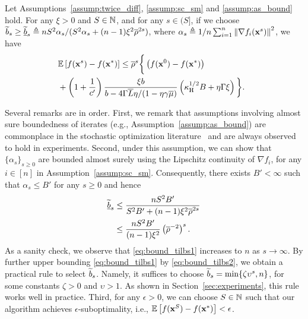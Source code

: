 \documentclass[10pt,twocolumn,journal]{IEEEtran}
\begin{document}
\begin{prop}\label{prop:subsamp_grad_outer}
Let Assumptions~\ref{assump:twice_diff}, \ref{assump:sc_sm} and \ref{assump:as_bound} hold. 
For any $\xi>0$ and $S\in\mathbb{N}$, and for any $s\in(S]$, %
if we choose $\widetilde{b}_s \ge {\underline{\widetilde{b}}}_s\triangleq nS^2\alpha_s/(S^2\alpha_s +(n-1)\xi^2\overline{\rho}^{2s})$, where $\alpha_s \triangleq {1}/{n}\sum_{i=1}^n \left\Vert\nabla f_i(\mathbf{x}^s)\right\Vert^2$, we have
\begin{align}
&\hspace{-.2cm}\bbE\left[f(\bx^{s})-f(\bx^*)\right] \le  \barrho^s\bigg\{\left(f(\bx^{0})-f(\bx^*)\right)\nn\\
&\hspace{-.2cm}+\left(1+\frac{1}{c'}\right)\frac{\xi b}{b-{4\Gamma\barL\eta}/{(1-\eta\gamma\barmu)}}\left(\kappa_\rmH^{1/2}B+{\eta\Gamma \xi}\right)\bigg\}. \label{eq:lin_conv_subsamp_grad}
\end{align}
\end{prop}

\begin{remark}\label{rmk:part_grad}
Several remarks are in order. First, we remark that assumptions involving almost sure boundedness of iterates (e.g., Assumption~\ref{assump:as_bound}) %
are commonplace in the stochastic optimization literature~\cite{Borkar_08,Hu_09,Reza_15} and are always observed to hold in   experiments. Second, under this assumption, we can show that $\{\alpha_s\}_{s\ge 0}$ are bounded almost surely using the Lipschitz continuity of $\nabla f_i$, for any $i\in[n]$ in Assumption~\ref{assump:sc_sm}. Consequently, there exists $B'<\infty$ such that $\alpha_s\le B'$ for any $s\ge 0$ and hence 
\begin{align}
\underline{\widetilde{b}}_s &\le \frac{nS^2B'}{S^2B' +(n-1)\xi^2\overline{\rho}^{2s}} \label{eq:bound_tilbs1}\\
&\le \frac{nS^2B'}{(n-1)\xi^2}\left(\overline{\rho}^{-2}\right)^s. \label{eq:bound_tilbs2}
\end{align}
As a sanity check, we observe that \eqref{eq:bound_tilbs1} increases to $n$ as $s\to\infty$. By further upper bounding \eqref{eq:bound_tilbs1} by \eqref{eq:bound_tilbs2}, we obtain a practical rule to select $\widetilde{b}_s$. Namely, it suffices to choose $\widetilde{b}_s = \min\{\zeta\upsilon^s,n\}$, for some constants $\zeta>0$ and $\upsilon>1$. As shown in Section~\ref{sec:experiments}, this rule works well in practice. Third, for any $\epsilon>0$, we can choose $S\in\mathbb{N}$ such that
 our algorithm achieves $\epsilon$-suboptimality, i.e., 
 $\mathbb{E}\left[f(\mathbf{x}^{S})-f(\mathbf{x}^*)\right]< \epsilon$. 
\end{remark}
\end{document}

